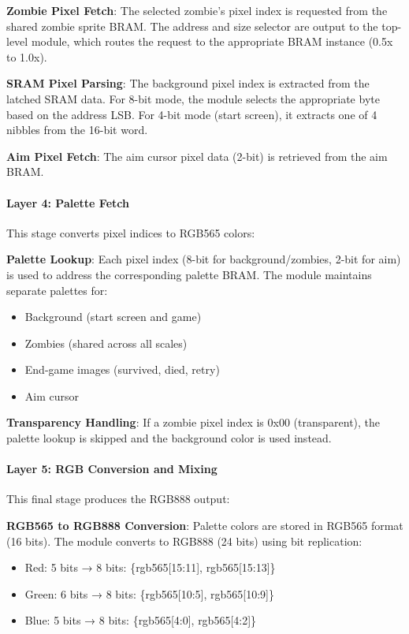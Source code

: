 \documentclass[12pt,a4paper]{article}
\begin{document}
\textbf{Zombie Pixel Fetch}: The selected zombie's pixel index is requested from the shared zombie sprite BRAM. The address and size selector are output to the top-level module, which routes the request to the appropriate BRAM instance (0.5x to 1.0x).

\textbf{SRAM Pixel Parsing}: The background pixel index is extracted from the latched SRAM data. For 8-bit mode, the module selects the appropriate byte based on the address LSB. For 4-bit mode (start screen), it extracts one of 4 nibbles from the 16-bit word.

\textbf{Aim Pixel Fetch}: The aim cursor pixel data (2-bit) is retrieved from the aim BRAM.

\paragraph{Layer 4: Palette Fetch}
This stage converts pixel indices to RGB565 colors:

\textbf{Palette Lookup}: Each pixel index (8-bit for background/zombies, 2-bit for aim) is used to address the corresponding palette BRAM. The module maintains separate palettes for:
\begin{itemize}
    \item Background (start screen and game)
    \item Zombies (shared across all scales)
    \item End-game images (survived, died, retry)
    \item Aim cursor
\end{itemize}

\textbf{Transparency Handling}: If a zombie pixel index is 0x00 (transparent), the palette lookup is skipped and the background color is used instead.

\paragraph{Layer 5: RGB Conversion and Mixing}
This final stage produces the RGB888 output:

\textbf{RGB565 to RGB888 Conversion}: Palette colors are stored in RGB565 format (16 bits). The module converts to RGB888 (24 bits) using bit replication:
\begin{itemize}
    \item Red: 5 bits → 8 bits: \{rgb565[15:11], rgb565[15:13]\}
    \item Green: 6 bits → 8 bits: \{rgb565[10:5], rgb565[10:9]\}
    \item Blue: 5 bits → 8 bits: \{rgb565[4:0], rgb565[4:2]\}
\end{itemize}
\end{document}

